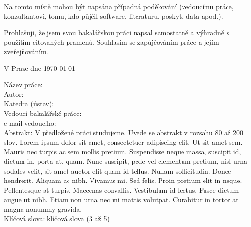 \normalsize %
\setcounter{page}{2} %
\cleardoublepage
\ \vspace{10mm} 

\noindent Na tomto místě mohou být napsána případná poděkování (vedoucímu práce, konzultantovi, tomu, kdo půjčil software, literaturu, poskytl data apod.). %

\vspace{\fill} %
\noindent Prohlašuji, že jsem svou bakalářskou práci napsal samostatně a výhradně s použitím citovaných pramenů. Souhlasím se zapůjčováním práce a jejím zveřejňováním.

\bigskip
\noindent V Praze dne \today\hspace{\fill}\bcAuthor\\ %

\cleardoublepage
\tableofcontents %

\cleardoublepage %

\noindent
Název práce: \bcTitle\\
Autor: \bcAuthor\\
Katedra (ústav): \bcKSVI\\
Vedoucí bakalářské práce: \bcTeacher\\
e-mail vedoucího: \bcTeacherMail\\

\noindent Abstrakt:  V předložené práci studujeme. Uvede se abstrakt v rozsahu 80 až 200 slov. Lorem ipsum dolor sit amet, consectetuer adipiscing elit. Ut sit amet sem. Mauris nec turpis ac sem mollis pretium. Suspendisse neque massa, suscipit id, dictum in, porta at, quam. Nunc suscipit, pede vel elementum pretium, nisl urna sodales velit, sit amet auctor elit quam id tellus. Nullam sollicitudin. Donec hendrerit. Aliquam ac nibh. Vivamus mi. Sed felis. Proin pretium elit in neque. Pellentesque at turpis. Maecenas convallis. Vestibulum id lectus. Fusce dictum augue ut nibh. Etiam non urna nec mi mattis volutpat. Curabitur in tortor at magna nonummy gravida.\\

\noindent Klíčová slova: klíčová slova (3 až 5)

